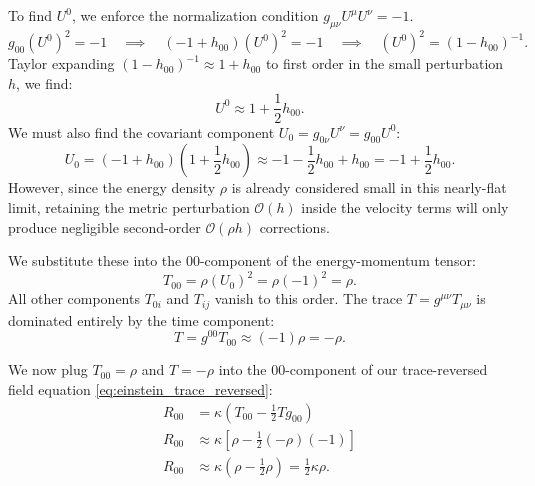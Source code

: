 \documentclass[11pt, a4paper]{report}
\begin{document}
To find $U^{0}$, we enforce the normalization condition $g_{\mu\nu}U^{\mu}U^{\nu} = -1$. %
\begin{equation}
g_{00}(U^{0})^{2} = -1 \quad \implies \quad (-1 + h_{00})(U^{0})^{2} = -1 \quad \implies \quad (U^{0})^{2} = (1 - h_{00})^{-1}.
\end{equation}
Taylor expanding $(1 - h_{00})^{-1} \approx 1 + h_{00}$ to first order in the small perturbation $h$, we find:
\begin{equation}
U^{0} \approx 1 + \frac{1}{2}h_{00}. %
\end{equation}
We must also find the covariant component $U_{0} = g_{0\nu}U^{\nu} = g_{00}U^{0}$:
\begin{equation}
U_{0} = (-1 + h_{00})\left(1 + \frac{1}{2}h_{00}\right) \approx -1 - \frac{1}{2}h_{00} + h_{00} = -1 + \frac{1}{2}h_{00}.
\end{equation}
However, since the energy density $\rho$ is already considered small in this nearly-flat limit, retaining the metric perturbation $\mathcal{O}(h)$ inside the velocity terms will only produce negligible second-order $\mathcal{O}(\rho h)$ corrections. %

We substitute these into the 00-component of the energy-momentum tensor:
\begin{equation}
T_{00} = \rho (U_{0})^{2} = \rho (-1)^{2} = \rho. %
\end{equation}
All other components $T_{0i}$ and $T_{ij}$ vanish to this order. %
The trace $T = g^{\mu\nu}T_{\mu\nu}$ is dominated entirely by the time component:
\begin{equation}
T = g^{00}T_{00} \approx (-1)\rho = -\rho. %
\end{equation}

We now plug $T_{00} = \rho$ and $T = -\rho$ into the 00-component of our trace-reversed field equation \eqref{eq:einstein_trace_reversed}: %
\begin{align}
R_{00} &= \kappa \left( T_{00} - \frac{1}{2}T g_{00} \right) \nonumber \\
R_{00} &\approx \kappa \left[ \rho - \frac{1}{2}(-\rho)(-1) \right] \nonumber \\
R_{00} &\approx \kappa \left( \rho - \frac{1}{2}\rho \right) = \frac{1}{2}\kappa\rho. %
\end{align}
\end{document}
